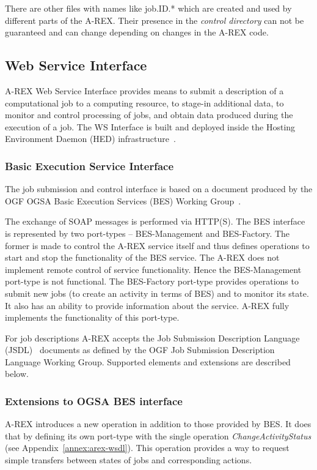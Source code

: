 \documentclass{article}                            %
\begin{document}
There are other files with names like job.ID.{*} which are created
and used by different parts of the A-REX. Their presence in the \textit{control
directory} can not be guaranteed and can change depending on changes
in the A-REX code.

\subsection{Web Service Interface}

A-REX Web Service Interface provides means to submit a description
of a computational job to a computing resource, to stage-in additional
data, to monitor and control processing of jobs, and obtain data produced
during the execution of a job. The WS Interface is built and deployed
inside the Hosting Environment Daemon (HED) infrastructure~\cite{hed}.

\subsubsection{Basic Execution Service Interface}

The job submission and control interface is based on a document produced
by the OGF OGSA Basic Execution Services (BES) Working Group~\cite{ogsa-bes}.

The exchange of SOAP messages is performed via HTTP(S). The BES interface
is represented by two port-types -- BES-Management and BES-Factory.
The former is made to control the A-REX service itself and thus defines
operations to start and stop the functionality of the BES service.
The A-REX does not implement remote control of service functionality.
Hence the BES-Management port-type is not functional. The BES-Factory
port-type provides operations to submit new jobs (to create an activity
in terms of BES) and to monitor its state. It also has an ability
to provide information about the service. A-REX fully implements the
functionality of this port-type.

For job descriptions A-REX accepts the Job Submission Description
Language (JSDL)~\cite{jsdl} documents as defined by the OGF Job Submission
Description Language Working Group. Supported elements and extensions
are described below.

\subsubsection{Extensions to OGSA BES interface}

A-REX introduces a new operation in addition to those provided by
BES. It does that by defining its own port-type with the single operation
\emph{ChangeActivityStatus} (see Appendix~\ref{annex:arex-wsdl}). This operation provides
a way to request simple transfers between states of jobs and corresponding
actions.
\end{document}
